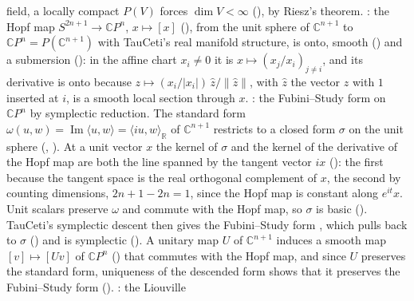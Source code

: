 \documentclass[11pt]{article}
\begin{document}
\begin{itemize}
  field, a locally compact $P(V)$ forces $\dim V < \infty$
  (), by Riesz's theorem.\newline
  : the Hopf map
  $S^{2n+1} \to \mathbb CP^n$, $x \mapsto [x]$ (), from the unit
  sphere of $\mathbb C^{n+1}$ to $\mathbb CP^n = P(\mathbb C^{n+1})$ with TauCeti's real
  manifold structure, is onto, smooth
  () and a submersion
  (): in the affine chart $x_i \ne 0$ it is
  $x \mapsto (x_j / x_i)_{j \ne i}$, and its derivative is onto because
  $z \mapsto (x_i/|x_i|)\,\hat z/\|\hat z\|$, with $\hat z$ the vector $z$ with $1$ inserted at
  $i$, is a smooth local section through $x$.\newline
  : the Fubini--Study form on
  $\mathbb CP^n$ by symplectic reduction. The standard form
  $\omega(u, w) = \operatorname{Im}\langle u, w\rangle = \langle iu, w\rangle_{\mathbb R}$ of
  $\mathbb C^{n+1}$ restricts to a closed form $\sigma$ on the unit sphere
  (, ). At a unit
  vector $x$ the kernel of $\sigma$ and the kernel of the derivative of the Hopf map are both the
  line spanned by the tangent vector $ix$ ():
  the first because the tangent space is the real orthogonal complement of $x$, the second by
  counting dimensions, $2n + 1 - 2n = 1$, since the Hopf map is constant along $e^{it}x$. Unit
  scalars preserve $\omega$ and commute with the Hopf map, so $\sigma$ is basic
  (). TauCeti's symplectic descent then gives the
  Fubini--Study form , which pulls back to $\sigma$
  () and is symplectic
  (). A unitary map $U$ of
  $\mathbb C^{n+1}$ induces a smooth map $[v] \mapsto [Uv]$ of $\mathbb CP^n$
  () that commutes with the Hopf map, and since $U$ preserves
  the standard form, uniqueness of the descended form shows that it preserves the Fubini--Study
  form ().\newline
  : the Liouville

\end{itemize}
\end{document}
